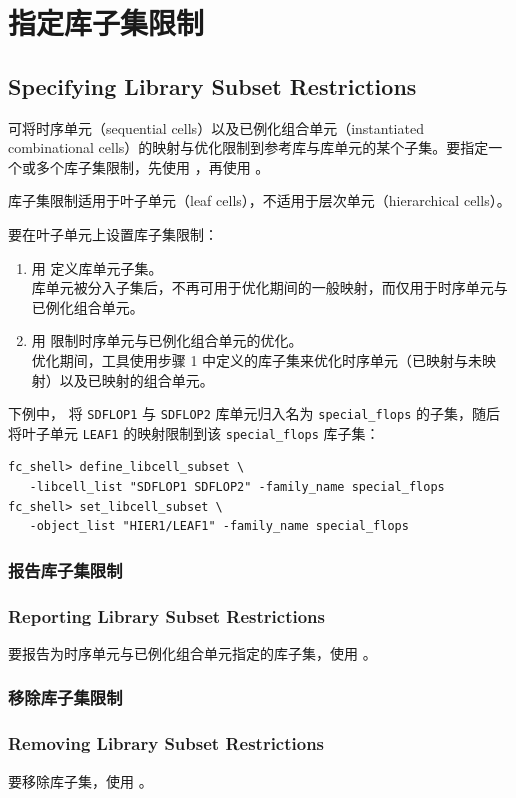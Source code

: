 
\section{指定库子集限制}
\subsection*{Specifying Library Subset Restrictions}

可将时序单元（sequential cells）以及已例化组合单元（instantiated combinational cells）的映射与优化限制到参考库与库单元的某个子集。要指定一个或多个库子集限制，先使用 ，再使用 。

\begin{noteBox}
库子集限制适用于叶子单元（leaf cells），不适用于层次单元（hierarchical cells）。
\end{noteBox}

要在叶子单元上设置库子集限制：
\begin{enumerate}
  \item 用  定义库单元子集。\\
    库单元被分入子集后，不再可用于优化期间的一般映射，而仅用于时序单元与已例化组合单元。
  \item 用  限制时序单元与已例化组合单元的优化。\\
    优化期间，工具使用步骤 1 中定义的库子集来优化时序单元（已映射与未映射）以及已映射的组合单元。
\end{enumerate}

下例中， 将 \texttt{SDFLOP1} 与 \texttt{SDFLOP2} 库单元归入名为 \texttt{special\_flops} 的子集，随后  将叶子单元 \texttt{LEAF1} 的映射限制到该 \texttt{special\_flops} 库子集：
\begin{lstlisting}
fc_shell> define_libcell_subset \
   -libcell_list "SDFLOP1 SDFLOP2" -family_name special_flops
fc_shell> set_libcell_subset \
   -object_list "HIER1/LEAF1" -family_name special_flops
\end{lstlisting}

\subsubsection{报告库子集限制}
\subsubsection*{Reporting Library Subset Restrictions}

要报告为时序单元与已例化组合单元指定的库子集，使用 。

\subsubsection{移除库子集限制}
\subsubsection*{Removing Library Subset Restrictions}

要移除库子集，使用 。

